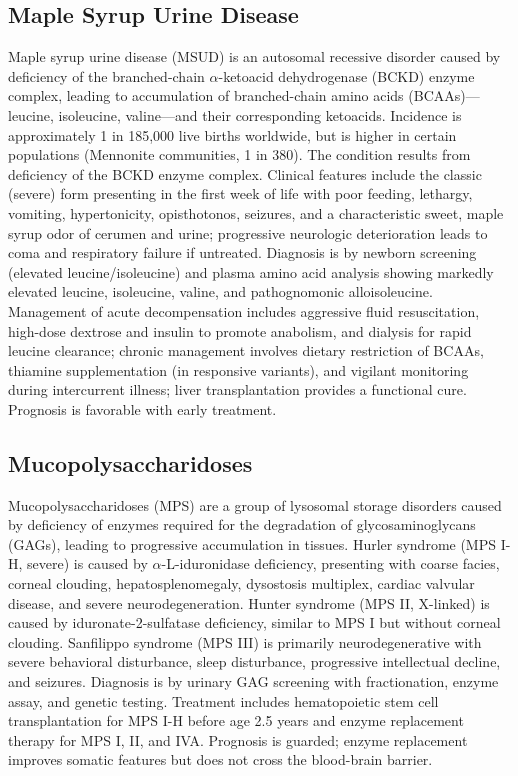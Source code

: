 \subsection{Maple Syrup Urine Disease}
\label{sec:Maple Syrup Urine Disease}
Maple syrup urine disease (MSUD) is an autosomal recessive disorder caused by deficiency of the branched-chain $\alpha$-ketoacid dehydrogenase (BCKD) enzyme complex, leading to accumulation of branched-chain amino acids (BCAAs)---leucine, isoleucine, valine---and their corresponding ketoacids. Incidence is approximately 1 in 185,000 live births worldwide, but is higher in certain populations (Mennonite communities, 1 in 380). The condition results from deficiency of the BCKD enzyme complex. Clinical features include the classic (severe) form presenting in the first week of life with poor feeding, lethargy, vomiting, hypertonicity, opisthotonos, seizures, and a characteristic sweet, maple syrup odor of cerumen and urine; progressive neurologic deterioration leads to coma and respiratory failure if untreated. Diagnosis is by newborn screening (elevated leucine/isoleucine) and plasma amino acid analysis showing markedly elevated leucine, isoleucine, valine, and pathognomonic alloisoleucine. Management of acute decompensation includes aggressive fluid resuscitation, high-dose dextrose and insulin to promote anabolism, and dialysis for rapid leucine clearance; chronic management involves dietary restriction of BCAAs, thiamine supplementation (in responsive variants), and vigilant monitoring during intercurrent illness; liver transplantation provides a functional cure. Prognosis is favorable with early treatment.

\subsection{Mucopolysaccharidoses}
\label{sec:Mucopolysaccharidoses}
Mucopolysaccharidoses (MPS) are a group of lysosomal storage disorders caused by deficiency of enzymes required for the degradation of glycosaminoglycans (GAGs), leading to progressive accumulation in tissues. Hurler syndrome (MPS I-H, severe) is caused by $\alpha$-L-iduronidase deficiency, presenting with coarse facies, corneal clouding, hepatosplenomegaly, dysostosis multiplex, cardiac valvular disease, and severe neurodegeneration. Hunter syndrome (MPS II, X-linked) is caused by iduronate-2-sulfatase deficiency, similar to MPS I but without corneal clouding. Sanfilippo syndrome (MPS III) is primarily neurodegenerative with severe behavioral disturbance, sleep disturbance, progressive intellectual decline, and seizures. Diagnosis is by urinary GAG screening with fractionation, enzyme assay, and genetic testing. Treatment includes hematopoietic stem cell transplantation for MPS I-H before age 2.5 years and enzyme replacement therapy for MPS I, II, and IVA. Prognosis is guarded; enzyme replacement improves somatic features but does not cross the blood-brain barrier.


